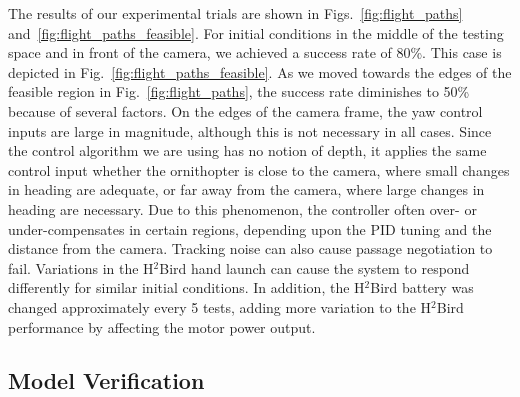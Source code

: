 \documentclass{aamas2013}
\begin{document}
The results of our experimental trials are shown in
Figs.~\ref{fig:flight_paths} and~\ref{fig:flight_paths_feasible}. For
initial conditions in the middle of the testing space and in front of the
camera, we achieved a success rate of 80\%. This case is depicted in
Fig.~\ref{fig:flight_paths_feasible}. As we moved towards the edges of the
feasible region in Fig.~\ref{fig:flight_paths}, the success rate diminishes
to 50\% because of several factors. On the edges of the camera frame, the yaw
control inputs are large in magnitude, although this is not necessary in all
cases. Since the control algorithm we are using has no notion of depth, it
applies the same control input whether the ornithopter is close to the camera,
where small changes in heading are adequate, or far away from the camera,
where large changes in heading are necessary. Due to this phenomenon, the
controller often over- or under-compensates in certain regions, depending upon
the PID tuning and the distance from the camera. Tracking noise can also cause
passage negotiation to fail. Variations in the H$^2$Bird hand launch can cause
the system to respond differently for similar initial conditions. In addition,
the H$^2$Bird battery was changed approximately every 5 tests, adding more
variation to the H$^2$Bird performance by affecting the motor power output.

\subsection{Model Verification}
\end{document}
